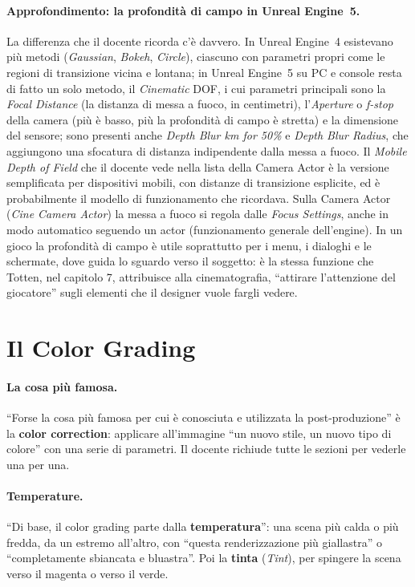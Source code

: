 \paragraph{Approfondimento: la profondità di campo in Unreal Engine~5.} La differenza che il
docente ricorda c'è davvero. In Unreal Engine~4 esistevano più metodi (\emph{Gaussian},
\emph{Bokeh}, \emph{Circle}), ciascuno con parametri propri come le regioni di transizione
vicina e lontana; in Unreal Engine~5 su PC e console resta di fatto un solo metodo, il
\emph{Cinematic} DOF, i cui parametri principali sono la \emph{Focal Distance} (la distanza
di messa a fuoco, in centimetri), l'\emph{Aperture} o \emph{f-stop} della camera (più è basso,
più la profondità di campo è stretta) e la dimensione del sensore; sono presenti anche
\emph{Depth Blur km for 50\%} e \emph{Depth Blur Radius}, che aggiungono una sfocatura di
distanza indipendente dalla messa a fuoco. Il \emph{Mobile Depth of Field} che il docente vede
nella lista della Camera Actor è la versione semplificata per dispositivi mobili, con distanze
di transizione esplicite, ed è probabilmente il modello di funzionamento che ricordava. Sulla
Camera Actor (\emph{Cine Camera Actor}) la messa a fuoco si regola dalle \emph{Focus Settings},
anche in modo automatico seguendo un actor (funzionamento generale dell'engine). In un gioco
la profondità di campo è utile soprattutto per i menu, i dialoghi e le schermate, dove guida lo
sguardo verso il soggetto: è la stessa funzione che Totten, nel capitolo 7, attribuisce alla
cinematografia, ``attirare l'attenzione del giocatore'' sugli elementi che il designer vuole
fargli vedere.

\section{Il Color Grading}
\label{ue16:sec:grading}

\paragraph{La cosa più famosa.} ``Forse la cosa più famosa per cui è conosciuta e utilizzata
la post-produzione'' è la \textbf{color correction}: applicare all'immagine ``un nuovo stile, un
nuovo tipo di colore'' con una serie di parametri. Il docente richiude tutte le sezioni per
vederle una per una.

\paragraph{Temperature.} ``Di base, il color grading parte dalla \textbf{temperatura}'': una
scena più calda o più fredda, da un estremo all'altro, con ``questa renderizzazione più
giallastra'' o ``completamente sbiancata e bluastra''. Poi la \textbf{tinta} (\emph{Tint}), per
spingere la scena verso il magenta o verso il verde.

